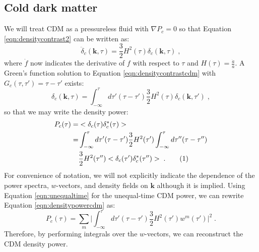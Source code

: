 \documentclass[twocolumn,superscriptaddress,prd]{revtex4}
\newcommand\numberthis{\addtocounter{equation}{1}\tag{\theequation}}
\begin{document}
\subsection{ Cold dark matter }
\label{sec:densitycdm}
We will treat CDM as a pressureless fluid with $\nabla
P_c=0$ so that Equation \eqref{eqn:densitycontrast2} can be written as:
\begin{equation}\label{eqn:densitycontrastcdm}
  \ddot{\delta}_c(\mathbf{k},\tau) = \frac{3}{2} H^2(\tau)
  \delta_c(\mathbf{k},\tau) \;,
\end{equation}
where $\dot{f}$ now indicates the derivative of $f$ with respect to
$\tau$ and $H(\tau) = \frac{\dot{a}}{a}$.
A Green's function solution to Equation
\eqref{eqn:densitycontrastcdm} with $G_c(\tau,\tau') = \tau-\tau'$  exists:
\begin{equation}\label{eqn:densitycdm}
  \delta_c(\mathbf{k}, \tau) = \int_{-\infty}^\tau d\tau' (\tau - \tau') \frac{3}{2}
  H^2(\tau) \delta_c(\mathbf{k},\tau')\;,
\end{equation}
so that we may write the density power:
\begin{align*}\label{eqn:densitypowercdm}
  P_c(\tau) = &< \delta_c(\tau) \delta_c^*(\tau)>\\ 
            =& \int_{-\infty}^\tau
 d\tau' (\tau-\tau') \frac{3}{2} 
H^2(\tau') \int_{-\infty}^\tau d\tau'' (\tau-\tau'') \\ &\frac{3}{2}
  H^2(\tau'') <\delta_c(\tau') \delta_c^*(\tau'') > \;. \numberthis
\end{align*}
For convenience of notation, we will not explicitly indicate the
dependence of the power spectra, $w$-vectors, and density fields on $\mathbf{k}$
although it is implied.
Using Equation \eqref{eqn:unequaltime} for the unequal-time CDM
 power, we can rewrite Equation
\eqref{eqn:densitypowercdm} as:
\begin{equation}\label{eqn:densitypowercdm2} 
  P_c(\tau) = \sum_m \bigg| \int_{-\infty}^\tau  d\tau' (\tau-\tau')
  \frac{3}{2} H^2(\tau') w^m(\tau') \bigg|^2 \;.
\end{equation}
Therefore, by performing integrals over the $w$-vectors, we
can reconstruct the CDM density power. 

\end{document}
